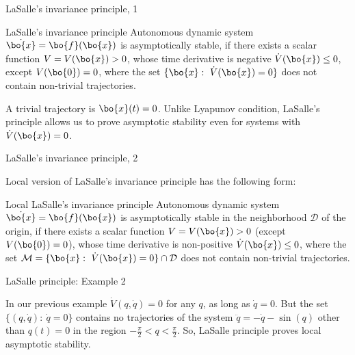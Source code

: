 \documentclass{beamer}
\begin{document}
\begin{frame}{LaSalle's invariance principle, 1}
	\begin{flushleft}
		
		\begin{block}{LaSalle's invariance principle}
			Autonomous dynamic system $\dot{\bo{x}} = \bo{f}(\bo{x})$ is asymptotically stable, if there exists a scalar function $V = V(\bo{x}) > 0$, whose time derivative is negative $\dot V(\bo{x}) \leq 0$, except $V(\bo{0}) = 0$, where the set $\{\bo{x}: \   \dot V(\bo{x}) = 0  \}$ does not contain non-trivial trajectories.
		\end{block}
	
		\bigskip
		
		A trivial trajectory is $\bo{x}(t) = 0$. Unlike Lyapunov condition, LaSalle's principle allows us to prove asymptotic stability even for systems with $\dot V(\bo{x}) = 0$.
		
		
	\end{flushleft}
\end{frame}




\begin{frame}{LaSalle's invariance principle, 2}
	\begin{flushleft}
		
		Local version of LaSalle's invariance principle has the following form:
		
		\begin{block}{Local LaSalle's invariance principle}
			Autonomous dynamic system $\dot{\bo{x}} = \bo{f}(\bo{x})$ is asymptotically stable in the neighborhood $\mathcal D$ of the origin, if there exists a scalar function $V = V(\bo{x}) > 0$ (except $V(\bo{0}) = 0$), whose time derivative is non-positive $\dot V(\bo{x}) \leq 0$, where the set $\mathcal M = \{\bo{x}: \   \dot V(\bo{x}) = 0  \} \cap \mathcal D$ does not contain non-trivial trajectories.
		\end{block}
		
		
	\end{flushleft}
\end{frame}



\begin{frame}{LaSalle principle: Example 2}
	\begin{flushleft}
		
			In our previous example $\dot V(q, \dot{q}) = 0$ for any $q$, as long as $\dot{q} = 0$. But the set $\{(q, \dot{q}): \   \dot{q} = 0 \}$ contains no trajectories of the system $\ddot{q}  = -\dot{q} - \sin(q)$ other than $q(t) = 0$ in the region $-\frac{\pi}{2} < q < \frac{\pi}{2}$. So, LaSalle principle proves local asymptotic stability.
		
	\end{flushleft}
\end{frame}
\end{document}
